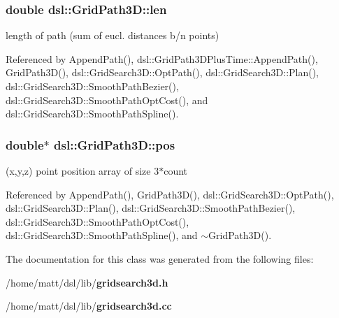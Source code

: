 \subsubsection[{len}]{\setlength{\rightskip}{0pt plus 5cm}double {\bf dsl\-::\-Grid\-Path3\-D\-::len}}\label{classdsl_1_1GridPath3D_a9a9295000002fee7806697d075be41d2}


length of path (sum of eucl. distances b/n points) 



\-Referenced by \-Append\-Path(), dsl\-::\-Grid\-Path3\-D\-Plus\-Time\-::\-Append\-Path(), \-Grid\-Path3\-D(), dsl\-::\-Grid\-Search3\-D\-::\-Opt\-Path(), dsl\-::\-Grid\-Search3\-D\-::\-Plan(), dsl\-::\-Grid\-Search3\-D\-::\-Smooth\-Path\-Bezier(), dsl\-::\-Grid\-Search3\-D\-::\-Smooth\-Path\-Opt\-Cost(), and dsl\-::\-Grid\-Search3\-D\-::\-Smooth\-Path\-Spline().

\subsubsection[{pos}]{\setlength{\rightskip}{0pt plus 5cm}double$\ast$ {\bf dsl\-::\-Grid\-Path3\-D\-::pos}}\label{classdsl_1_1GridPath3D_a40d6e7d70427c9233ae8b0e8b2a82124}


(x,y,z) point position array of size 3$\ast$count 



\-Referenced by \-Append\-Path(), \-Grid\-Path3\-D(), dsl\-::\-Grid\-Search3\-D\-::\-Opt\-Path(), dsl\-::\-Grid\-Search3\-D\-::\-Plan(), dsl\-::\-Grid\-Search3\-D\-::\-Smooth\-Path\-Bezier(), dsl\-::\-Grid\-Search3\-D\-::\-Smooth\-Path\-Opt\-Cost(), dsl\-::\-Grid\-Search3\-D\-::\-Smooth\-Path\-Spline(), and $\sim$\-Grid\-Path3\-D().



\-The documentation for this class was generated from the following files\-:\begin{DoxyCompactItemize}
\item 
/home/matt/dsl/lib/{\bf gridsearch3d.\-h}\item 
/home/matt/dsl/lib/{\bf gridsearch3d.\-cc}\end{DoxyCompactItemize}
